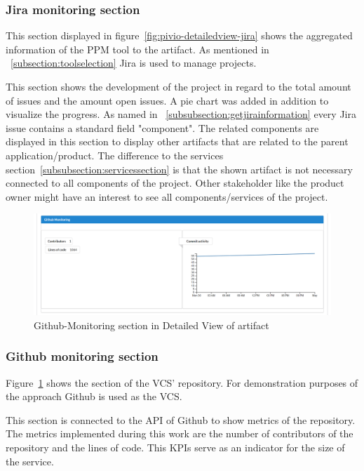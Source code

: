 \subsubsection{Jira monitoring section}

This section displayed in figure~\ref{fig:pivio-detailedview-jira} shows the aggregated information of the PPM tool to the artifact. As mentioned in ~\ref{subsection:toolselection} Jira is used to manage projects. 

This section shows the development of the project in regard to the total amount of issues and the amount open issues. A pie chart was added in addition to visualize the progress. As named in ~\ref{subsubsection:getjirainformation} every Jira issue contains a standard field "component". The related components are displayed in this section to display other artifacts that are related to the parent application/product. The difference to the services section~\ref{subsubsection:servicessection} is that the shown artifact is not necessary connected to all components of the project. Other stakeholder like the product owner might have an interest to see all components/services of the project.

\begin{figure}[htpb]
  \centering
  \includegraphics[width=1.0\textwidth]{figures/pivio-detailview-github.png} \caption{Github-Monitoring section in Detailed View of artifact}
  \label{fig:pivio-detailedview-github}
\end{figure}
\subsubsection{Github monitoring section}

Figure~\ref{fig:pivio-detailedview-github} shows the section of the VCS' repository. For demonstration purposes of the approach Github is used as the VCS.

This section is connected to the API of Github to show metrics of the repository. The metrics implemented during this work are the number of contributors of the repository and the lines of code. This KPIs serve as an indicator for the size of the service.

